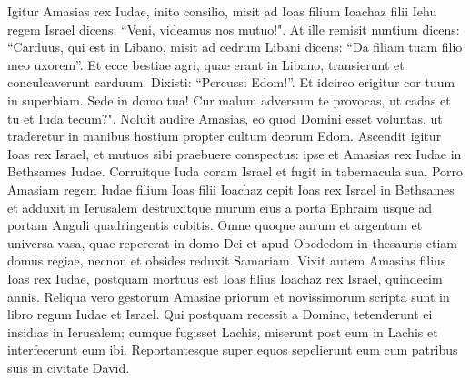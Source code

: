 \begin{biblechapter}
\verse Igitur Amasias rex Iudae, inito consilio, misit ad Ioas filium Ioachaz filii Iehu regem Israel dicens: “Veni, videamus nos mutuo!". 
\verse At ille remisit nuntium dicens: “Carduus, qui est in Libano, misit ad cedrum Libani dicens: “Da filiam tuam filio meo uxorem”. Et ecce bestiae agri, quae erant in Libano, transierunt et conculcaverunt carduum. 
\verse Dixisti: “Percussi Edom!”. Et idcirco erigitur cor tuum in superbiam. Sede in domo tua! Cur malum adversum te provocas, ut cadas et tu et Iuda tecum?". 
\verse Noluit audire Amasias, eo quod Domini esset voluntas, ut traderetur in manibus hostium propter cultum deorum Edom. 
\verse Ascendit igitur Ioas rex Israel, et mutuos sibi praebuere conspectus: ipse et Amasias rex Iudae in Bethsames Iudae. 
\verse Corruitque Iuda coram Israel et fugit in tabernacula sua. 
\verse Porro Amasiam regem Iudae filium Ioas filii Ioachaz cepit Ioas rex Israel in Bethsames et adduxit in Ierusalem destruxitque murum eius a porta Ephraim usque ad portam Anguli quadringentis cubitis. 
\verse Omne quoque aurum et argentum et universa vasa, quae repererat in domo Dei et apud Obededom in thesauris etiam domus regiae, necnon et obsides reduxit Samariam. 
\verse Vixit autem Amasias filius Ioas rex Iudae, postquam mortuus est Ioas filius Ioachaz rex Israel, quindecim annis. 
\verse Reliqua vero gestorum Amasiae priorum et novissimorum scripta sunt in libro regum Iudae et Israel. 
\verse Qui postquam recessit a Domino, tetenderunt ei insidias in Ierusalem; cumque fugisset Lachis, miserunt post eum in Lachis et interfecerunt eum ibi. 
\verse Reportantesque super equos sepelierunt eum cum patribus suis in civitate David. 
\end{biblechapter}

